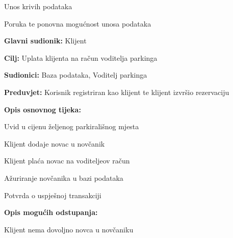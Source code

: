 \begin{packed_item}
\begin{packed_item}
\begin{packed_item}
    						\item[2.a] Unos krivih podataka
    						\item[] \begin{packed_enum}
    							
    							\item Poruka te ponovna mogućnost unosa podataka
    					
    						\end{packed_enum}
    						
    					\end{packed_item}
    				\end{packed_item}
    				\noindent {}
    			\begin{packed_item}
    				
    				\item \textbf{Glavni sudionik: } Klijent
    				\item  \textbf{Cilj:} Uplata klijenta na račun voditelja parkinga
    				\item  \textbf{Sudionici:} Baza podataka, Voditelj parkinga
    				\item  \textbf{Preduvjet:} Korisnik registriran kao klijent te klijent izvršio rezervaciju
    				\item  \textbf{Opis osnovnog tijeka:}
    				
    				\item[] \begin{packed_enum}
    					
    					\item Uvid u cijenu željenog parkirališnog mjesta
    					\item Klijent dodaje novac u novčanik
    					\item Klijent plaća novac na voditeljeov račun
    					\item Ažuriranje novčanika u bazi podataka
    					\item Potvrda o uspješnoj transakciji

    				\end{packed_enum}
    				
    				\item  \textbf{Opis mogućih odstupanja:}
    				
    				\item[] \begin{packed_item}
    					
    					\item[2.a] Klijent nema dovoljno novca u novčaniku
    					\item[] \begin{packed_enum}
    						

\end{packed_enum}
\end{packed_item}
\end{packed_item}
\end{packed_item}
